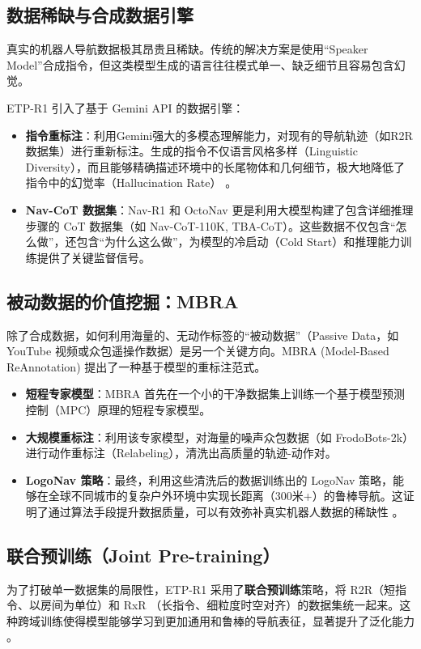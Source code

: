 \subsection{数据稀缺与合成数据引擎}
真实的机器人导航数据极其昂贵且稀缺。传统的解决方案是使用“Speaker Model”合成指令，但这类模型生成的语言往往模式单一、缺乏细节且容易包含幻觉。

ETP-R1 引入了基于 Gemini API 的数据引擎：
\begin{itemize}
    \item \textbf{指令重标注}：利用Gemini强大的多模态理解能力，对现有的导航轨迹（如R2R数据集）进行重新标注。生成的指令不仅语言风格多样（Linguistic Diversity），而且能够精确描述环境中的长尾物体和几何细节，极大地降低了指令中的幻觉率（Hallucination Rate）  。
    \item \textbf{Nav-CoT 数据集}：Nav-R1   和 OctoNav   更是利用大模型构建了包含详细推理步骤的 CoT 数据集（如 Nav-CoT-110K, TBA-CoT）。这些数据不仅包含“怎么做”，还包含“为什么这么做”，为模型的冷启动（Cold Start）和推理能力训练提供了关键监督信号。
\end{itemize}

\subsection{被动数据的价值挖掘：MBRA}
除了合成数据，如何利用海量的、无动作标签的“被动数据”（Passive Data，如 YouTube 视频或众包遥操作数据）是另一个关键方向。MBRA (Model-Based ReAnnotation) \cite{mbra_drive} 提出了一种基于模型的重标注范式。
\begin{itemize}
    \item \textbf{短程专家模型}：MBRA 首先在一个小的干净数据集上训练一个基于模型预测控制（MPC）原理的短程专家模型。
    \item \textbf{大规模重标注}：利用该专家模型，对海量的噪声众包数据（如 FrodoBots-2k）进行动作重标注（Relabeling），清洗出高质量的轨迹-动作对。
    \item \textbf{LogoNav 策略}：最终，利用这些清洗后的数据训练出的 LogoNav 策略，能够在全球不同城市的复杂户外环境中实现长距离（300米+）的鲁棒导航。这证明了通过算法手段提升数据质量，可以有效弥补真实机器人数据的稀缺性 \cite{mbra_drive}。
\end{itemize}

\subsection{联合预训练（Joint Pre-training）}
为了打破单一数据集的局限性，ETP-R1 采用了\textbf{联合预训练}策略，将 R2R（短指令、以房间为单位）和 RxR \cite{ku2020rxr}（长指令、细粒度时空对齐）的数据集统一起来。这种跨域训练使得模型能够学习到更加通用和鲁棒的导航表征，显著提升了泛化能力  。

